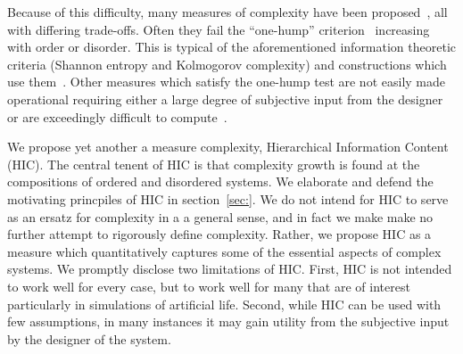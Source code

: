 Because of this difficulty, many measures of complexity have been
proposed~\citep{lloyd2001measures}, all with differing trade-offs. Often they
fail the ``one-hump'' criterion~\citep{adami2002complexity} increasing with
order or disorder. This is typical of the aforementioned information theoretic
criteria (Shannon entropy and Kolmogorov complexity) and constructions which
use them~\citep{lloyd1988complexity}. Other measures which satisfy the one-hump
test are not easily made operational requiring either a large degree of
subjective input from the designer or are exceedingly difficult to
compute~\citep{crutchfield1989inferring, gell1996information,
grassberger1986toward}.

We propose yet another a measure complexity, Hierarchical Information Content
(HIC). The central tenent of HIC is that complexity growth is found at the
compositions of ordered and disordered systems. We elaborate and defend the
motivating princpiles of HIC in section~\ref{sec:}. We do not intend for HIC to
serve as an ersatz for complexity in a a general sense, and in fact we make
make no further attempt to rigorously define complexity. Rather, we propose HIC
as a measure which quantitatively captures some of the essential aspects of
complex systems. We promptly disclose two limitations of HIC. First, HIC is
not intended to work well for every case, but to work well for many that are of
interest particularly in simulations of artificial life. Second, while HIC can
be used with few assumptions, in many instances it may gain utility from the
subjective input by the designer of the system.
